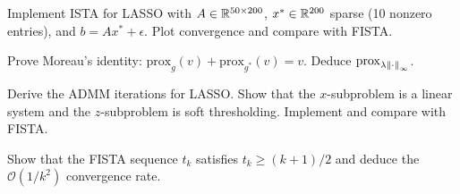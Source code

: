 \begin{exercise}
Implement ISTA for LASSO with $A \in \mathbb{R}^{50 \times 200}$,
$x^* \in \mathbb{R}^{200}$ sparse (10 nonzero entries), and $b = Ax^* + \epsilon$.
Plot convergence and compare with FISTA.
\end{exercise}

\begin{exercise}
Prove Moreau's identity: $\mathrm{prox}_g(v) + \mathrm{prox}_{g^*}(v) = v$.
Deduce $\mathrm{prox}_{\lambda\left\| \cdot \right\|_\infty}$.
\end{exercise}

\begin{exercise}
Derive the ADMM iterations for LASSO. Show that the $x$-subproblem is a
linear system and the $z$-subproblem is soft thresholding. Implement and
compare with FISTA.
\end{exercise}

\begin{exercise}
Show that the FISTA sequence $t_k$ satisfies $t_k \geq (k+1)/2$ and deduce
the $\mathcal{O}(1/k^2)$ convergence rate.
\end{exercise}

